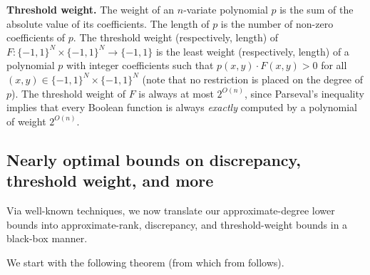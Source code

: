 \documentclass{toc}
\newcommand{\bits}{\{-1,1\}}
\begin{document}
\medskip \noindent \textbf{Threshold weight.}
The weight of an $n$-variate polynomial $p$
is the sum of the absolute value of its coefficients. The length of $p$
is the number of non-zero coefficients of $p$.
The threshold weight (respectively, length) of $F \colon \bits^N \times \bits^N \to \bits$ is the least weight (respectively, length) of a polynomial 
$p$ with integer coefficients such that $p(x, y) \cdot F(x,y) > 0$ for all $(x, y) \in \bits^N \times \bits^N$ (note that
no restriction is placed on the degree of $p$). The threshold weight of $F$ is always at most $2^{O(n)}$,
since Parseval's inequality implies that every Boolean function is always \emph{exactly} computed
by a polynomial of weight $2^{O(n)}$. 


\subsection{Nearly optimal bounds on discrepancy, threshold weight, and more}
Via well-known techniques, we now translate our %
approximate-degree lower bounds into approximate-rank, discrepancy, and threshold-weight bounds %
in a black-box manner.

We start with the following theorem (from which  from  follows).
\end{document}
